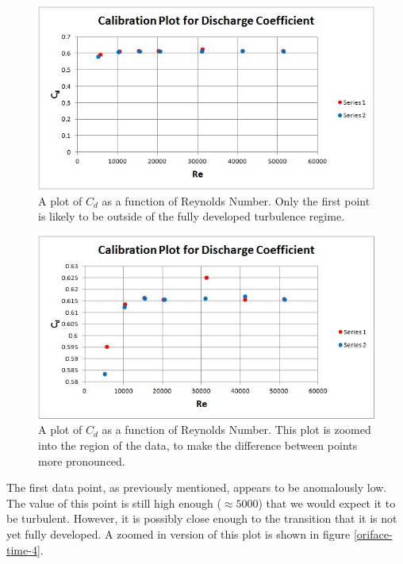 \documentclass{article}
\begin{document}
  \begin{figure}[!htb]
   \begin{center}
    \includegraphics[width = 12 cm]{figs/cd_v_re_zero_axis.jpg}
    \caption{A plot of $C_d$ as a function of Reynolds Number. Only the first point is likely to be 
outside of the fully developed turbulence regime. }
    \label{orif}
   \end{center}
  \end{figure}

  \begin{figure}[!htb]
   \begin{center}
    \includegraphics[width = 12 cm]{figs/cd_v_re.jpg}
    \caption{A plot of $C_d$ as a function of Reynolds Number. This plot is zoomed into the region of the data, 
    to make the difference between points more pronounced.}
    \label{orif}
   \end{center}
  \end{figure}

The first data point, as previously mentioned, appears to be anomalously low. The value of this point is 
still high enough ($\approx 5000$) that we would expect it to be turbulent. However, it is possibly close enough 
to the transition that it is not yet fully developed. A zoomed in version of this plot is shown 
in figure \ref{oriface-time-4}.  
\end{document}
